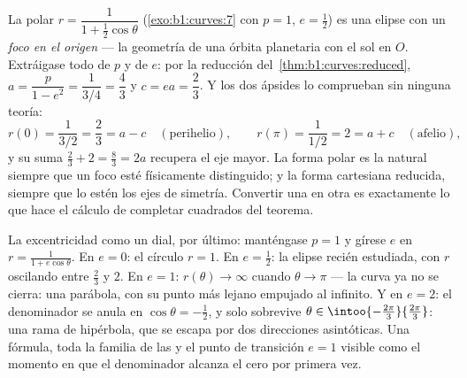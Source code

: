 \begin{example}
\label{ex:b1:curves:orbit}
La  polar $r = \dfrac{1}{1 + \frac12\cos\theta}$
(\cref{exo:b1:curves:7} con $p = 1$, $e = \frac12$) es una elipse con
un \emph{foco en el origen} --- la geometría de una órbita planetaria
con el sol en $O$. Extráigase todo de $p$ y de $e$: por la reducción
del~\cref{thm:b1:curves:reduced}, $a = \dfrac{p}{1 - e^2} =
\dfrac{1}{3/4} = \dfrac43$ y $c = ea = \dfrac23$. Y los dos ápsides
lo comprueban sin ninguna teoría:
\[
r(0) = \frac{1}{3/2} = \frac23 = a - c
\quad (\text{perihelio}),
\qquad
r(\pi) = \frac{1}{1/2} = 2 = a + c
\quad (\text{afelio}),
\]
y su suma $\frac23 + 2 = \frac83 = 2a$ recupera el eje mayor. La
forma polar es la natural siempre que un foco esté físicamente
distinguido; y la forma cartesiana reducida, siempre que lo estén los
ejes de simetría. Convertir una en otra es exactamente lo que hace el
cálculo de completar cuadrados del teorema.

La excentricidad como un dial, por último: manténgase $p = 1$ y
gírese $e$ en $r = \frac{1}{1 + e\cos\theta}$. En $e = 0$: el círculo
$r = 1$. En $e = \frac12$: la elipse recién estudiada, con $r$
oscilando entre $\frac23$ y $2$. En $e = 1$: $r(\theta) \to \infty$
cuando $\theta \to \pi$ --- la curva ya no se cierra: una parábola,
con su punto más lejano empujado al infinito. Y en $e = 2$: el
denominador se anula en $\cos\theta = -\frac12$, y solo sobrevive
$\theta \in \intoo{-\frac{2\pi}3}{\frac{2\pi}3}$: una rama de
hipérbola, que se escapa por dos direcciones asintóticas. Una
fórmula, toda la familia de las  y el punto de transición
$e = 1$ visible como el momento en que el denominador alcanza el cero
por primera vez.
\end{example}

